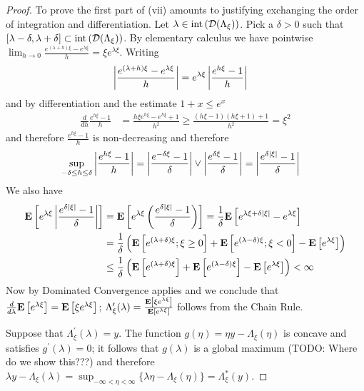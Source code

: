 \begin{proof}
To prove the first part of (vii) amounts to justifying exchanging the order of integration and differentiation.  Let $\lambda \in \operatorname*{int} \left( \mathcal{D}(\Lambda_\xi) \right)$.  Pick a $\delta >0$ such that $[\lambda - \delta, \lambda + \delta] \subset \operatorname*{int} \left( \mathcal{D}(\Lambda_\xi) \right)$.  By elementary calculus we have pointwise $\lim_{h \to 0} \frac{e^{(\lambda + h) \xi} - e^{\lambda \xi}}{h} = \xi e^{\lambda \xi}$.  Writing 
\begin{align*}
\left \vert \frac{e^{(\lambda + h) \xi} - e^{\lambda \xi}}{h} \right \vert &=e^{\lambda \xi}\left \vert \frac{e^{h \xi} - 1}{h} \right \vert
\end{align*}
and by differentiation and the estimate $1+x \leq e^x$
\begin{align*}
\frac{d}{dh} \frac{e^{h \xi} - 1}{h} &= \frac{h \xi e^{h \xi} - e^{h \xi} + 1}{h^2} \geq  \frac{(h \xi  -1)(h \xi + 1)+ 1}{h^2} = \xi^2
\end{align*}
and therefore $\frac{e^{h \xi} - 1}{h}$ is non-decreasing and therefore 
\begin{align*}
\sup_{-\delta \leq h \leq \delta} \left \vert \frac{e^{h \xi} - 1}{h} \right \vert &= \left \vert \frac{e^{-\delta \xi} - 1}{\delta} \right \vert  \vee \left \vert \frac{e^{\delta \xi} - 1}{\delta} \right \vert = \left \vert \frac{e^{\delta \left \vert \xi \right \vert} - 1}{\delta} \right \vert
\end{align*}
We also have
\begin{align*}
\textbf{E}\left[e^{\lambda \xi}\left \vert \frac{e^{\delta \left \vert \xi \right \vert} - 1}{\delta} \right \vert\right] &=\textbf{E}\left[e^{\lambda \xi}\left( \frac{e^{\delta \left \vert \xi \right \vert} - 1}{\delta} \right)\right] =\frac{1}{\delta}\textbf{E}\left[e^{\lambda \xi + \delta \left \vert \xi \right \vert} - e^{\lambda \xi}\right] \\
&= \frac{1}{\delta} \left(\textbf{E}\left[e^{(\lambda + \delta)\xi}; \xi \geq 0\right]  + \textbf{E}\left[e^{(\lambda - \delta)\xi}; \xi < 0\right]- \textbf{E}\left[e^{\lambda \xi}\right] \right ) \\
&\leq \frac{1}{\delta} \left (\textbf{E}\left[e^{(\lambda + \delta)\xi}\right]  + \textbf{E}\left[e^{(\lambda - \delta)\xi}\right] - \textbf{E}\left[e^{\lambda \xi}\right] \right ) < \infty \\
\end{align*}
Now by Dominated Convergence applies and we conclude that $\frac{d}{d\lambda} \textbf{E}\left[e^{\lambda \xi}\right] = \textbf{E}\left[\xi e^{\lambda \xi}\right]$;  $\Lambda_\xi^\prime(\lambda) = \frac{\textbf{E}\left[\xi e^{\lambda \xi}\right]}{\textbf{E}\left[e^{\lambda \xi}\right]}$ follows from the Chain Rule.

Suppose that $\Lambda_\xi^\prime(\lambda) = y$.  The function $g(\eta) = \eta y - \Lambda_\xi(\eta)$ is concave and satisfies $g^\prime(\lambda) = 0$; it follows that $g(\lambda)$ is a global maximum (TODO: Where do we show this???) and therefore $\lambda y - \Lambda_\xi(\lambda) = \sup_{-\infty < \eta < \infty} \lbrace \lambda \eta - \Lambda_\xi(\eta)\rbrace = \Lambda_\xi^*(y)$.
\end{proof}

